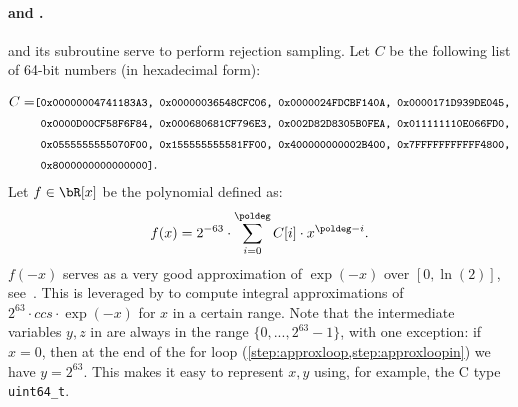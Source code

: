 \begin{algorithm}[!htb]
	\caption{$\basesampler()$}\label{alg:basesampler}
	\begin{algorithmic}[1]
		\Require {-}
		 
		\label{line:basesampler} 
		 
		\EndFor
	\end{algorithmic}
\end{algorithm}



\paragraph{\berexp and \approxexp.} \longberexp and its subroutine \longapproxexp serve to perform rejection sampling. Let $C$ be the following list of 64-bit numbers (in hexadecimal form):

\begin{align*}
C = & \footnotesize{\texttt{%
	[0x00000004741183A3, 0x00000036548CFC06, 0x0000024FDCBF140A, 0x0000171D939DE045,}} \\
	& \footnotesize{\texttt{%
	\ 0x0000D00CF58F6F84, 0x000680681CF796E3, 0x002D82D8305B0FEA, 0x011111110E066FD0,}}\\%
	& \footnotesize{\texttt{%
	\ 0x0555555555070F00, 0x155555555581FF00, 0x400000000002B400, 0x7FFFFFFFFFFF4800,}}\\%
	& \footnotesize{\texttt{%
	\ 0x8000000000000000]}}.%
\end{align*}
Let $f \in \bR[x]$ be the polynomial defined as:
$$f(x) = 2^{-63} \cdot \sum_{i=0}^{\poldeg} C[i] \cdot x^{\poldeg - i}.$$
$f(-x)$ serves as a very good approximation of $\exp(-x)$ over $[0, \ln(2)]$, see~\cite{TC:ZhaSteSak20}. This is leveraged by \longapproxexp to compute integral approximations of $2^{63} \cdot ccs \cdot \exp(-x)$ for $x$ in a certain range. Note that the intermediate variables $y, z$ in \approxexp are always in the range $\{0, ..., 2^{63} - 1\}$, with one exception: if $x = 0$, then at the end of the for loop (\cref{step:approxloop,step:approxloopin}) we have $y = 2^{63}$. This makes it easy to represent $x,y$ using, for example, the C type \verb+uint64_t+.


